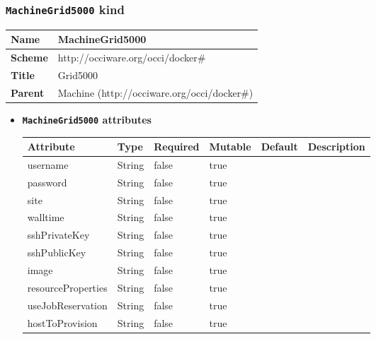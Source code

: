 \subsubsection{\texttt{MachineGrid5000} kind}
\begin{center}
\begin{tabular}{|l|l|}
  \hline
  \textbf{Name} & MachineGrid5000 \\
  \hline  
  \textbf{Scheme} & http://occiware.org/occi/docker\# \\
  \hline
  \textbf{Title} & Grid5000 \\
  \hline
  \textbf{Parent} & Machine (http://occiware.org/occi/docker\#) \\
  \hline
\end{tabular}
\end{center}
\begin{itemize}
\item \textbf{\texttt{MachineGrid5000} attributes}

\begin{tabularx}{\textwidth}{|l|l|p{1.4cm}|p{1.3cm}|l|X|}
  \hline
  \textbf{Attribute} & \textbf{Type} & \textbf{Required} & \textbf{Mutable} & \textbf{Default} & \textbf{Description} \\
  \hline  
  username & String & false & true &  &  \\
  \hline
  password & String & false & true &  &  \\
  \hline
  site & String & false & true &  &  \\
  \hline
  walltime & String & false & true &  &  \\
  \hline
  sshPrivateKey & String & false & true &  &  \\
  \hline
  sshPublicKey & String & false & true &  &  \\
  \hline
  image & String & false & true &  &  \\
  \hline
  resourceProperties & String & false & true &  &  \\
  \hline
  useJobReservation & String & false & true &  &  \\
  \hline
  hostToProvision & String & false & true &  &  \\
  \hline
\end{tabularx}
\end{itemize}



